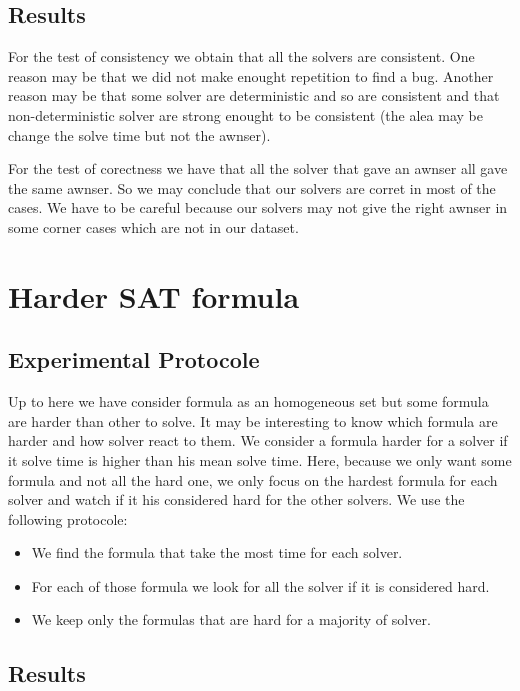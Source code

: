 \documentclass{article}
\begin{document}
\subsection{Results}

For the test of consistency we obtain that all the solvers are consistent. One reason may be that we did not make enought repetition to find a bug. Another reason may be that some solver are deterministic  and so are consistent and that non-deterministic solver are strong enought to be consistent (the alea may be  change the solve time but not the awnser).

For the test of corectness we have that all the solver that gave an awnser all gave the same awnser. So we may conclude that our solvers are corret in most of the cases. We have to be careful because our solvers may not give the right awnser in some corner cases which are not in our dataset. 

\section{Harder SAT formula}
\subsection{Experimental Protocole}
Up to here we have consider formula as an homogeneous set but some formula are harder than other to solve. It may be interesting to know which formula are harder and how solver react to them. We consider a formula harder for a solver if it solve time is higher than his mean solve time. Here, because we only want some formula and not all the hard one, we only focus on the hardest formula for each solver and watch if it his considered hard for the other solvers. We use the following protocole:

\vskip 3mm

\begin{itemize}
\item We find the formula that take the most time for each solver.
\item For each of those formula we look for all the solver if it is considered hard.
\item We keep only the formulas that are hard for a majority of solver. 
\end{itemize}
\subsection{Results}
\end{document}
